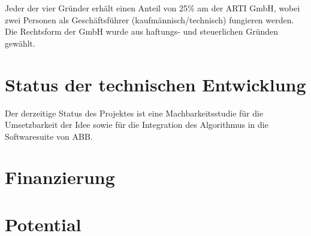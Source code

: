 Jeder der vier Gründer erhält einen Anteil von 25\% am der ARTI GmbH, wobei zwei Personen als Geschäftsführer (kaufmännisch/technisch) fungieren werden. Die Rechtsform der GmbH wurde aus haftungs- und steuerlichen Gründen gewählt.


\section{Status der technischen Entwicklung}

Der derzeitige Status des Projektes ist eine Machbarkeitsstudie für die Umsetzbarkeit der Idee sowie für die Integration des Algorithmus in die Softwaresuite von ABB.

\section{Finanzierung}



\section{Potential}



\blindtext
\newpage
\blindtext